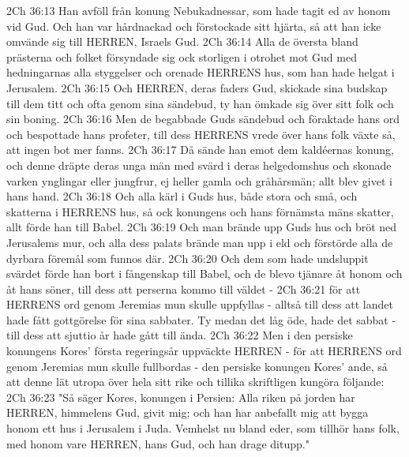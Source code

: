 2Ch 36:13  Han avföll från konung Nebukadnessar, som hade tagit ed av honom vid Gud. Och han var hårdnackad och förstockade sitt hjärta, så att han icke omvände sig till HERREN, Israels Gud.
2Ch 36:14  Alla de översta bland prästerna och folket försyndade sig ock storligen i otrohet mot Gud med hedningarnas alla styggelser och orenade HERRENS hus, som han hade helgat i Jerusalem.
2Ch 36:15  Och HERREN, deras faders Gud, skickade sina budskap till dem titt och ofta genom sina sändebud, ty han ömkade sig över sitt folk och sin boning.
2Ch 36:16  Men de begabbade Guds sändebud och föraktade hans ord och bespottade hans profeter, till dess HERRENS vrede över hans folk växte så, att ingen bot mer fanns.
2Ch 36:17  Då sände han emot dem kaldéernas konung, och denne dräpte deras unga män med svärd i deras helgedomshus och skonade varken ynglingar eller jungfrur, ej heller gamla och gråhårsmän; allt blev givet i hans hand.
2Ch 36:18  Och alla kärl i Guds hus, både stora och små, och skatterna i HERRENS hus, så ock konungens och hans förnämsta mäns skatter, allt förde han till Babel.
2Ch 36:19  Och man brände upp Guds hus och bröt ned Jerusalems mur, och alla dess palats brände man upp i eld och förstörde alla de dyrbara föremål som funnos där.
2Ch 36:20  Och dem som hade undsluppit svärdet förde han bort i fångenskap till Babel, och de blevo tjänare åt honom och åt hans söner, till dess att perserna kommo till väldet -
2Ch 36:21  för att HERRENS ord genom Jeremias mun skulle uppfyllas - alltså till dess att landet hade fått gottgörelse för sina sabbater. Ty medan det låg öde, hade det sabbat - till dess att sjuttio år hade gått till ända.
2Ch 36:22  Men i den persiske konungens Kores' första regeringsår uppväckte HERREN - för att HERRENS ord genom Jeremias mun skulle fullbordas - den persiske konungen Kores' ande, så att denne lät utropa över hela sitt rike och tillika skriftligen kungöra följande:
2Ch 36:23  "Så säger Kores, konungen i Persien: Alla riken på jorden har HERREN, himmelens Gud, givit mig; och han har anbefallt mig att bygga honom ett hus i Jerusalem i Juda. Vemhelst nu bland eder, som tillhör hans folk, med honom vare HERREN, hans Gud, och han drage ditupp."



